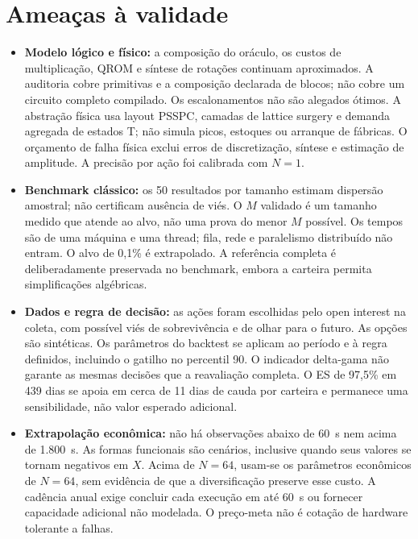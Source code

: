 \documentclass[conference,a4paper]{IEEEtran}
\providecommand{\tightlist}{\setlength{\itemsep}{0pt}\setlength{\parskip}{0pt}}
\begin{document}
\section{Ameaças à validade}\label{ameauxe7as-uxe0-validade}

\begin{itemize}
\tightlist
\item
  \textbf{Modelo lógico e físico:} a composição do oráculo, os custos de multiplicação, QROM e síntese de rotações continuam aproximados. A auditoria cobre primitivas e a composição declarada de blocos; não cobre um circuito completo compilado. Os escalonamentos não são alegados ótimos. A abstração física usa layout PSSPC, camadas de lattice surgery e demanda agregada de estados T; não simula picos, estoques ou arranque de fábricas. O orçamento de falha física exclui erros de discretização, síntese e estimação de amplitude. A precisão por ação foi calibrada com \(N=1\).
\item
  \textbf{Benchmark clássico:} os 50 resultados por tamanho estimam dispersão amostral; não certificam ausência de viés. O \(M\) validado é um tamanho medido que atende ao alvo, não uma prova do menor \(M\) possível. Os tempos são de uma máquina e uma thread; fila, rede e paralelismo distribuído não entram. O alvo de 0,1\% é extrapolado. A referência completa é deliberadamente preservada no benchmark, embora a carteira permita simplificações algébricas.
\item
  \textbf{Dados e regra de decisão:} as ações foram escolhidas pelo open interest na coleta, com possível viés de sobrevivência e de olhar para o futuro. As opções são sintéticas. Os parâmetros do backtest se aplicam ao período e à regra definidos, incluindo o gatilho no percentil 90. O indicador delta-gama não garante as mesmas decisões que a reavaliação completa. O ES de 97,5\% em 439 dias se apoia em cerca de 11 dias de cauda por carteira e permanece uma sensibilidade, não valor esperado adicional.
\item
  \textbf{Extrapolação econômica:} não há observações abaixo de 60~s nem acima de 1.800~s. As formas funcionais são cenários, inclusive quando seus valores se tornam negativos em \(X\). Acima de \(N=64\), usam-se os parâmetros econômicos de \(N=64\), sem evidência de que a diversificação preserve esse custo. A cadência anual exige concluir cada execução em até 60~s ou fornecer capacidade adicional não modelada. O preço-meta não é cotação de hardware tolerante a falhas.
\end{itemize}
\end{document}
